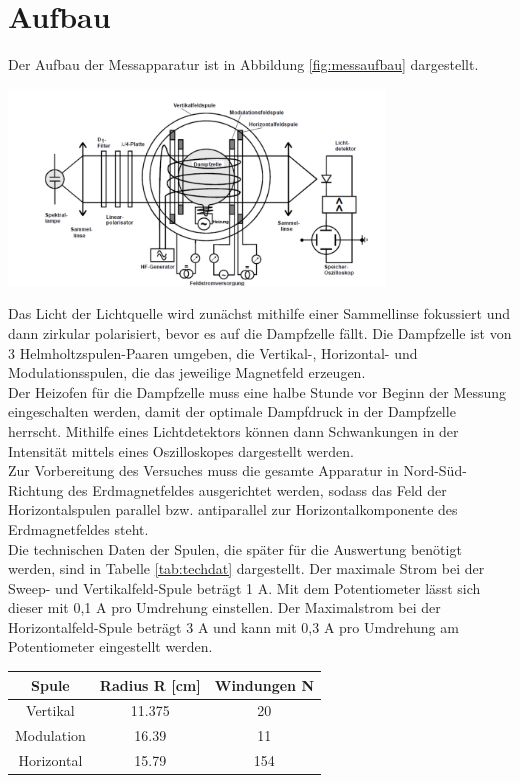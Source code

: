 \documentclass[]{scrartcl}
\begin{document}
\section{Aufbau}
Der Aufbau der Messapparatur ist in Abbildung \ref{fig:messaufbau} dargestellt. 
\begin{center}
	\includegraphics[width=10cm]{images/messaufbau.png}
	\label{fig:messaufbau}
\end{center}
Das Licht der Lichtquelle wird zunächst mithilfe einer Sammellinse fokussiert und dann zirkular polarisiert, bevor es auf die Dampfzelle fällt. Die Dampfzelle ist von 3 Helmholtzspulen-Paaren umgeben, die Vertikal-, Horizontal- und Modulationsspulen, die das jeweilige Magnetfeld erzeugen. \\
Der Heizofen für die Dampfzelle muss eine halbe Stunde vor Beginn der Messung eingeschalten werden, damit der optimale Dampfdruck in der Dampfzelle herrscht. Mithilfe eines Lichtdetektors können dann Schwankungen in der Intensität mittels eines Oszilloskopes dargestellt werden. \\
Zur Vorbereitung des Versuches muss die gesamte Apparatur in Nord-Süd-Richtung des Erdmagnetfeldes ausgerichtet werden, sodass das Feld der Horizontalspulen parallel bzw. antiparallel zur Horizontalkomponente des Erdmagnetfeldes steht. \\
Die technischen Daten der Spulen, die später für die Auswertung benötigt werden, sind in Tabelle \ref{tab:techdat} dargestellt. Der maximale Strom bei der Sweep- und Vertikalfeld-Spule beträgt 1 A. Mit dem Potentiometer lässt sich dieser mit 0,1 A pro Umdrehung einstellen. Der Maximalstrom bei der Horizontalfeld-Spule beträgt 3 A und kann mit 0,3 A pro Umdrehung am Potentiometer eingestellt werden.
\begin{center}
	\begin{tabular}{|c|c|c|}
		\hline Spule & Radius R [cm] & Windungen N \\
		\hline Vertikal & 11.375 & 20 \\
		\hline Modulation & 16.39 & 11 \\
		\hline Horizontal & 15.79 & 154 \\
		\hline
	\end{tabular}
\label{tab:techdat}
\end{center}
\end{document}
